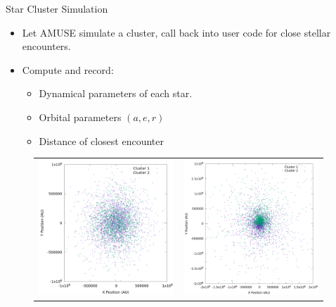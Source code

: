 \documentclass{beamer}
\begin{document}
\begin{frame}{Star Cluster Simulation}
    \begin{itemize}
        \item Let AMUSE simulate a cluster, call back into user code for close
            stellar encounters.
        \item Compute and record:
            \begin{itemize}
                \item Dynamical parameters of each star.
                \item Orbital parameters $(a, e, r)$
                \item Distance of closest encounter
            \end{itemize}
    \end{itemize}
    \begin{figure}
        \begin{tabular}{cc}
            \includegraphics[height=2.0in]{clusters_superimposed_n_2000} &
            \includegraphics[height=2.0in]{clusters_superimposed_final_n_2000}
        \end{tabular}
    \end{figure}
\end{frame}
\end{document}

